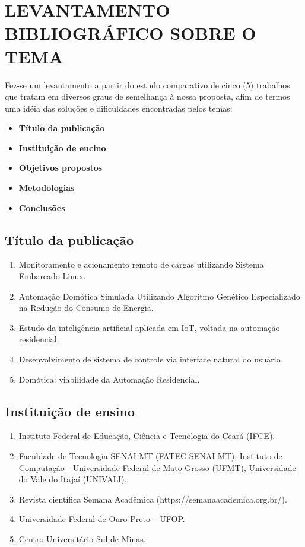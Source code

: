 \documentclass[10pt,brazil,english]{article}
\begin{document}
\section{\uppercase{Levantamento bibliográfico sobre o tema}}

Fez-se um levantamento a partir do estudo comparativo de cinco (5) trabalhos que tratam em diversos graus de semelhança à nossa proposta, afim de termos uma idéia das soluções e dificuldades encontradas pelos temas:

\begin{itemize}
\item \textbf{Título da publicação}
\item \textbf{Instituição de encino}
\item \textbf{Objetivos propostos} 
\item \textbf{Metodologias} 
\item \textbf{Conclusões}
\end{itemize}

\subsection{Título da publicação}
\begin{enumerate}
\item Monitoramento e acionamento remoto de cargas utilizando Sistema Embarcado Linux.
\item Automação Domótica Simulada Utilizando Algoritmo Genético Especializado na Redução do Consumo de Energia. 
\item Estudo da inteligência artificial aplicada em IoT, voltada na automação residencial. 
\item Desenvolvimento de sistema de controle via interface natural do usuário. 
\item Domótica: viabilidade da Automação Residencial.
\end{enumerate}

\subsection{Instituição de ensino}
\begin{enumerate}
\item Instituto Federal de Educação, Ciência e Tecnologia do Ceará (IFCE).
\item Faculdade de Tecnologia SENAI MT (FATEC SENAI MT), Instituto de Computação - Universidade Federal de Mato Grosso (UFMT), Universidade do Vale do Itajaí (UNIVALI). 
\item Revista científica Semana Acadêmica (https://semanaacademica.org.br/). 
\item Universidade Federal de Ouro Preto – UFOP. 
\item Centro Universitário Sul de Minas.
\end{enumerate}
\end{document}
